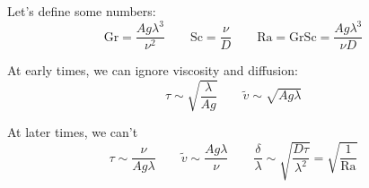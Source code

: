 \documentclass[12pt]{beamer}
\begin{document}
\begin{frame}[t]
\begin{center}
\end{center}
\end{frame}

\begin{frame}[t]
Let's define some numbers:
\begin{equation*}
\text{Gr} = \frac{A g \lambda^3}{\nu^2} \qquad \text{Sc} = \frac{\nu}{D} \qquad \text{Ra} = \text{Gr} \text{Sc} = \frac{A g \lambda^3}{\nu D}
\end{equation*}

At early times, we can ignore viscosity and diffusion:
\begin{equation*}
\tau \sim \sqrt{\frac{\lambda}{A g}} \qquad \tilde{v} \sim \sqrt{A g \lambda}
\end{equation*}

At later times, we can't
\begin{equation*}
\tau \sim \frac{\nu}{A g \lambda} \qquad \tilde{v} \sim \frac{A g \lambda}{\nu} \qquad \frac{\delta}{\lambda} \sim \sqrt{\frac{D \tau}{\lambda^2}} = \sqrt{\frac{1}{\text{Ra}}}
\end{equation*}
\end{frame}
\end{document}
